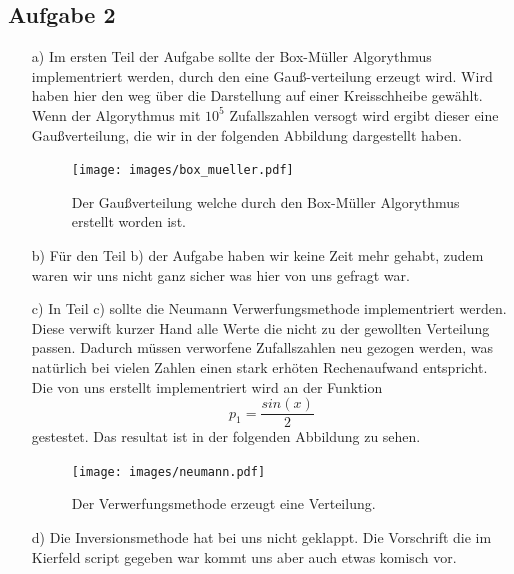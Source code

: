       \subsection{Aufgabe 2}
      \begin{itemize}
        \item[a)]
      Im ersten Teil der Aufgabe sollte der Box-Müller Algorythmus implementriert werden, durch den eine Gauß-verteilung erzeugt wird.
      Wird haben hier den weg über die Darstellung auf einer Kreisschheibe gewählt.
      Wenn der Algorythmus mit $10^5$ Zufallszahlen versogt wird ergibt dieser eine Gaußverteilung, die wir in der folgenden Abbildung dargestellt haben.

      \begin{figure}
        \centering
        \texttt{[image: images/box\_mueller.pdf]}
        \caption{Der Gaußverteilung welche durch den Box-Müller Algorythmus erstellt worden ist.}
      \end{figure}
      \FloatBarrier
      \item[b)]
      Für den Teil b) der Aufgabe haben wir keine Zeit mehr gehabt, zudem waren wir uns nicht ganz sicher was hier von uns gefragt war.
      \item[c)]
      In Teil c) sollte die Neumann Verwerfungsmethode implementriert werden.
      Diese verwift kurzer Hand alle Werte die nicht zu der gewollten Verteilung passen.
      Dadurch müssen verworfene Zufallszahlen neu gezogen werden, was natürlich bei vielen Zahlen einen stark erhöten Rechenaufwand entspricht.
      Die von uns erstellt implementriert wird an der Funktion 
      \begin{equation}
        p_1 = \frac{sin(x)}{2}
      \end{equation}
      gestestet.
      Das resultat ist in der folgenden Abbildung zu sehen.

      \begin{figure}
        \centering
        \texttt{[image: images/neumann.pdf]}
        \caption{Der Verwerfungsmethode erzeugt eine Verteilung.}
      \end{figure}
      \FloatBarrier
      \item[d)]
      Die Inversionsmethode hat bei uns nicht geklappt. Die Vorschrift die im Kierfeld script gegeben war kommt uns aber auch etwas komisch vor.
    \end{itemize}
\label{sec:auswertung}
